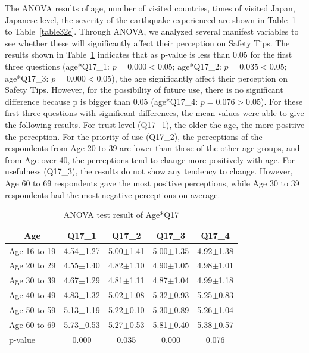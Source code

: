 The ANOVA results of age, number of visited countries, times of visited Japan, Japanese level, the severity of the earthquake experienced are shown in Table~\ref{table32a} to Table~\ref{table32e}. Through ANOVA, we analyzed several manifest variables to see whether these will significantly affect their perception on Safety Tips. The results shown in Table~\ref{table32a} indicates that as p-value is less than 0.05 for the first three questions (age*Q17\_1: $p=0.000<0.05$; age*Q17\_2: $p=0.035<0.05$; age*Q17\_3: $p=0.000<0.05$), the age significantly affect their perception on Safety Tips. However, for the possibility of future use, there is no significant difference because p is bigger than 0.05 (age*Q17\_4: $p=0.076>0.05$). For these first three questions with significant differences, the mean values were able to give the following results. For trust level (Q17\_1), the older the age, the more positive the perception. For the priority of use (Q17\_2), the perceptions of the respondents from Age 20 to 39 are lower than those of the other age groups, and from Age over 40, the perceptions tend to change more positively with age. For usefulness (Q17\_3), the results do not show any tendency to change. However, Age 60 to 69 respondents gave the most positive perceptions, while Age 30 to 39 respondents had the most negative perceptions on average. 

\begin{table}[h]
  \caption{ANOVA test result of Age*Q17}
  \label{table32a}
  \centering
  \begin{tabular}{l|cccc}
 \hline
        \multicolumn{1}{c|}{Age}          & Q17\_1               & Q17\_2 & Q17\_3    & Q17\_4      \\
\hline
Age 16 to 19 & 4.54$\pm$1.27                    & 5.00$\pm$1.41                    & 5.00$\pm$1.35                    & 4.92$\pm$1.38                    \\
Age 20 to 29 & 4.55$\pm$1.40                    & 4.82$\pm$1.10                    & 4.90$\pm$1.05                    & 4.98$\pm$1.01                    \\
Age 30 to 39 & 4.67$\pm$1.29                    & 4.81$\pm$1.11                    & 4.87$\pm$1.04                    & 4.99$\pm$1.18                    \\
Age 40 to 49 & 4.83$\pm$1.32                    & 5.02$\pm$1.08                    & 5.32$\pm$0.93                    & 5.25$\pm$0.83                    \\
Age 50 to 59 & 5.13$\pm$1.19                    & 5.22$\pm$0.10                    & 5.30$\pm$0.89                    & 5.26$\pm$1.04                    \\
Age 60 to 69 & 5.73$\pm$0.53                    & 5.27$\pm$0.53                    & 5.81$\pm$0.40                    & 5.38$\pm$0.57                    \\
\hline
p-value&           0.000&         0.035&         0.000&   0.076     \\
 \hline
  \end{tabular}
\end{table}



